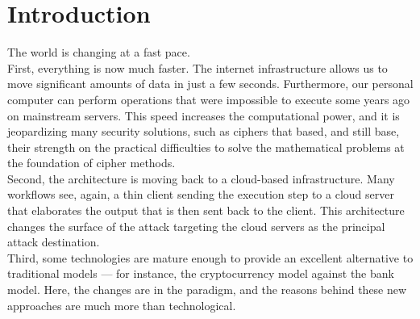 \documentclass[12pt]{article}
\begin{document}
	\newpage
	\section{Introduction}
	The world is changing at a fast pace.\\
	First, everything is now much faster. The internet infrastructure allows us to move significant amounts of data in just a few seconds. Furthermore, our personal computer can perform operations that were impossible to execute some years ago on mainstream servers. This speed increases the computational power, and it is jeopardizing many security solutions, such as ciphers that based, and still base, their strength on the practical difficulties to solve the mathematical problems at the foundation of cipher methods.\\
	Second, the architecture is moving back to a cloud-based infrastructure. Many workflows see, again, a thin client sending the execution step to a cloud server that elaborates the output that is then sent back to the client. This architecture changes the surface of the attack targeting the cloud servers as the principal attack destination.\\
	Third, some technologies are mature enough to provide an excellent alternative to traditional models — for instance, the cryptocurrency model against the bank model. Here, the changes are in the paradigm, and the reasons behind these new approaches are much more than technological.\\
		
\end{document}
